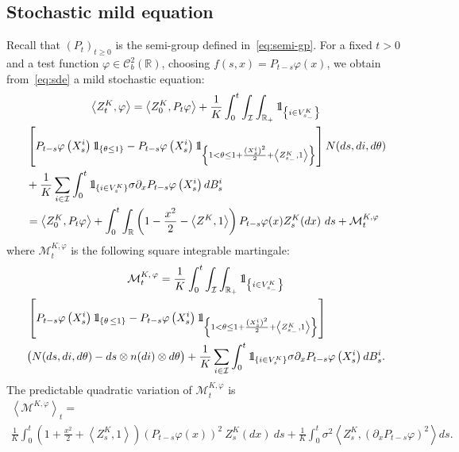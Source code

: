\documentclass[10pt]{amsart}
\theoremstyle{definition}\newtheorem{defi}[theo]{Definition}\newtheorem{rema}[theo]{Remark}\newtheorem{exam}[theo]{Example}\newtheorem{exem}[theo]{Example}\newtheorem{nota}[theo]{Notation}
\newcommand{\Co}{\mathcal{C}}
\newcommand{\Io}{\mathcal{I}}
\newcommand{\Mo}{\mathcal{M}}
\newcommand*\R{\mathbb{R}}
\newcommand*\ind{{\mathchoice {\rm 1\mskip-4mu l} {\rm 1\mskip-4mu l} {\rm 1\mskip-4.5mu l} {\rm 1\mskip-5mu l}}}
\begin{document}
\subsection{Stochastic mild equation}\label{app:sde-mild}
\label{app:stoch-mild}
Recall that $(P_t)_{t \geq 0}$ is the semi-group defined in~\eqref{eq:semi-gp}. For a fixed $t >0$ and a test function $\varphi\in \Co_b^2(\R)$, choosing $f(s,x)=P_{t-s}\varphi(x)$, we obtain from~\eqref{eq:sde} a mild stochastic equation:
\begingroup
\allowdisplaybreaks
\begin{multline}\label{eq:sde-mild}
\left\langle Z^{K}_t,\varphi\right\rangle = \left\langle Z^{K}_0,P_t\varphi\right\rangle
+ \frac{1}{K}\int_0^t \int_{\Io}\int_{\R_+}\ind_{\left\{i \in V^K_{s_-}\right\}}\\
\begin{aligned}
& \left[P_{t-s}\varphi\left(X^i_s\right)\ind_{\left\{\theta \leq 1\right\}} - P_{t-s}\varphi\left(X^i_s\right) \ind_{\left\{1 < \theta \leq 1+ \frac{\left(X^i_s\right)^2}{2}+\left\langle Z_{s_-}^{K}, 1\right\rangle\right\}} \right] N(ds, di, d\theta)\\
&+\frac{1}{K}\sum_{i \in \Io}\int_0^t \ind_{\left\{i \in V^K_s\right\}} \sigma \partial_x P_{t-s}\varphi\left(X^i_s\right) dB^i_s\\
 & =\left\langle Z^{K}_0,P_t\varphi\right\rangle+ \int_0^t \int_{\R} \left(1-\frac{x^2}{2}-\left\langle Z^{K},1\right\rangle\right) P_{t-s}\varphi(x) Z^{K}_s(dx)\ ds + \Mo_t^{K, \varphi}
\end{aligned}
\end{multline}
\endgroup
where $\Mo_t^{K, \varphi}$ is the following square integrable martingale:
\begingroup
\allowdisplaybreaks
\begin{multline}\label{app:martingale-mild}
\Mo_t^{K,\,\varphi}= \frac{1}{K}\int_0^t \int_{\Io}\int_{\R_+}\ind_{\left\{i \in  V^K_{s_-}\right\}}\\
\begin{aligned}
&\left[P_{t-s}\varphi\left(X^i_s\right)\ind_{\left\{\theta\,\leq 1\right\}}
- P_{t-s}\varphi\left(X^i_s\right) \ind_{\left\{1 < \theta \leq 1+\frac{\left(X^i_s\right)^2}{2}+\left\langle Z_{s_-}^{K},1\right\rangle\right\}} \right]
\\
&\big(N(ds, di, d\theta)-ds\otimes n(di)\otimes d\theta \big)
+ \frac{1}{K}\sum_{i \in \Io}\int_0^t \ind_{\left\{i \in V^K_s\right\}} \sigma \partial_x P_{t-s}\varphi\left(X^i_s\right) dB^i_s.
\end{aligned}
\end{multline}
\endgroup
The predictable quadratic variation of $\Mo_t^{K,\varphi}$ is
\begin{multline}\label{app:crochet-mild}
\left\langle \Mo^{K, \varphi}\right\rangle_t=\\
\frac{1}{K} \int_0^t \left(1+\frac{x^2}{2}+\left\langle Z_s^{K},1\right\rangle\right) \left(P_{t-s}\varphi(x)\right)^2 \ Z^{K}_s(dx)\ ds+ \frac{1}{K} \int_0^t \sigma^2 \left\langle Z^{K}_s, \left(\partial_x P_{t-s}\varphi \right)^2 \right\rangle ds.
\end{multline}
\end{document}
